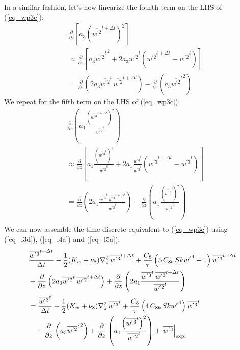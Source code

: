 \documentclass[11pt,fleqn]{article}
\newcommand{\ptlder}[2]{\frac{\partial #1}{\partial #2}}
\begin{document}
%
In a similar fashion, let's now linearize the fourth term on the LHS of
(\ref{eq_wp3c}):
%
\begin{equation}
\label{eq_l4a}
\begin{split}
& \ptlder{}{z} \left[ a_3 \left(\overline{w^{'2}}^{t+\Delta t}\right)^2 \right] \\
&\approx  \ptlder{}{z} 
    \left[
      a_3 {\overline{w^{'2}}^t}^2
      + 2 a_3 \overline{w^{'2}}^t
              \left( \overline{w^{'2}}^{t+\Delta t} - \overline{w^{'2}}^{t} \right) 
    \right] \\
&= \ptlder{}{z} \left( 2 a_3 \overline{w^{'2}}^t \, \overline{w^{'2}}^{t+\Delta t} \right)
 - \ptlder{}{z} \left( a_3 {\overline{w^{'2}}^t}^2 \right)
\end{split}
\end{equation}
%
We repeat for the fifth term on the LHS of (\ref{eq_wp3c}):
%
\begin{equation}
\label{eq_l5a}
\begin{split}
& \ptlder{}{z} 
     \left(
        a_1 \frac{ \left( {\overline{w^{'3}}^{t + \Delta t}}\right)^2 }
                 { \overline{w^{'2}}^t }
     \right) \\
&\approx
  \ptlder{}{z}
  \left[
    a_1 \frac{ \left( {\overline{w^{'3}}^t}\right)^2 }
             { \overline{w^{'2}}^t }
  + 2 a_1 \frac{ \overline{w^{'3}}^t }{ \overline{w^{'2}}^t }
          \left( \overline{w^{'3}}^{t+\Delta t} - \overline{w^{'3}}^{t} \right) 
  \right] \\
&=
  \ptlder{}{z}
  \left(
    2 a_1 \frac{ \overline{w^{'3}}^t \, \overline{w^{'3}}^{t+\Delta t} }
               { \overline{w^{'2}}^t }
  \right)
- \ptlder{}{z}
  \left(
    a_1 \frac{ \left( {\overline{w^{'3}}^t}\right)^2 }
             { \overline{w^{'2}}^t }
  \right) \\
\end{split}
\end{equation}
%
We can now assemble the time discrete equivalent to (\ref{eq_wp3c}) using
(\ref{eq_l3d}), (\ref{eq_l4a}) and (\ref{eq_l5a}):
%
\begin{equation}
\label{eq_wp3d}
\begin{split}
& \frac{\overline{w^{'3}}^{t+\Delta t}}{\Delta t} 
- \frac{1}{2} (K_w + \nu_8) \nabla_z^2 \, \overline{w^{'3}}^{t+\Delta t}
+ \frac{C_8}{\tau}
   \left(  5 \, C_{8b} \, {Skw^t}^4 + 1 \right)
   \overline{w^{'3}}^{t + \Delta t}
\\ &
+ \ptlder{}{z} \left( 2 a_3 \overline{w^{'2}}^t \, \overline{w^{'2}}^{t+\Delta t} \right)
+ \ptlder{}{z}
  \left(
    2 a_1 \frac{ \overline{w^{'3}}^t \, \overline{w^{'3}}^{t+\Delta t} }
               { \overline{w^{'2}}^t }
  \right)
\\
&=
  \frac{\overline{w^{'3}}^{t}}{\Delta t} 
  + \frac{1}{2} (K_w + \nu_8) \nabla_z^2 \, \overline{w^{'3}}^t
  +  \frac{C_8}{\tau}
      \left( 4 \, C_{8b} \, {Skw^t}^4 \right) \overline{w^{'3}}^t
\\ & \quad
  + \ptlder{}{z} \left( a_3 {\overline{w^{'2}}^t}^2 \right)
  + \ptlder{}{z}
    \left(
      a_1 \frac{ \left( {\overline{w^{'3}}^t}\right)^2 }
               { \overline{w^{'2}}^t }
    \right)
  + \left. \overline{w^{'3}} \right|_{\rm expl}
\end{split}
\end{equation}
\end{document}
